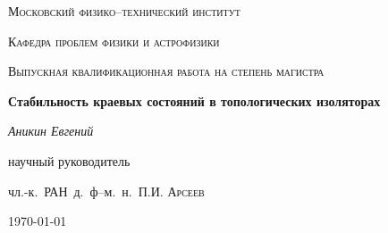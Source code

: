 \begin{titlepage}
	\centering
	{\scshape\LARGE Московский физико--технический институт\par}
	{\scshape Кафедра проблем физики и астрофизики \par}
	\vspace{1cm}
	{\scshape\Large Выпускная квалификационная работа на степень магистра\par}
	\vspace{1.5cm}
	{\huge\bfseries Стабильность краевых состояний в топологических изоляторах
        \par}

	\vspace{2cm}
	{\Large\itshape Аникин Евгений\par}
	\vfill
	научный руководитель\par
	чл.-к.~РАН~д.~ф--м.~н.~П.И. \textsc{Арсеев}

	\vfill

	{\large \today\par}
\end{titlepage}
